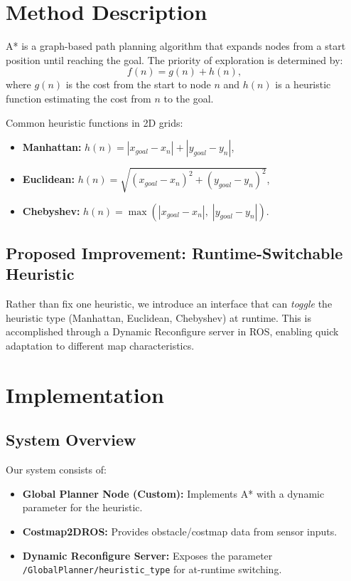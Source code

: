 \documentclass[letterpaper, 10 pt, conference]{ieeeconf}
\begin{document}
\section{Method Description}\label{sec:method}
A* \cite{hart1968formal} is a graph-based path planning algorithm that expands 
nodes from a start position until reaching the goal. The priority of exploration 
is determined by:
\begin{equation}
f(n) = g(n) + h(n),
\end{equation}
where $g(n)$ is the cost from the start to node $n$ and $h(n)$ is a heuristic 
function estimating the cost from $n$ to the goal. 

Common heuristic functions in 2D grids:
\begin{itemize}
    \item \textbf{Manhattan:} $h(n) = |x_{goal} - x_n| + |y_{goal} - y_n|$,
    \item \textbf{Euclidean:} $h(n) = \sqrt{(x_{goal}-x_n)^2 + (y_{goal}-y_n)^2}$,
    \item \textbf{Chebyshev:} $h(n) = \max(|x_{goal} - x_n|,\; |y_{goal} - y_n|).$
\end{itemize}

\subsection{Proposed Improvement: Runtime-Switchable Heuristic}
Rather than fix one heuristic, we introduce an interface that can \textit{toggle} 
the heuristic type (Manhattan, Euclidean, Chebyshev) at runtime. This is accomplished 
through a Dynamic Reconfigure server in ROS, enabling quick adaptation to different 
map characteristics.

\section{Implementation}\label{sec:implementation}
\subsection{System Overview}
Our system consists of:
\begin{itemize}
    \item \textbf{Global Planner Node (Custom):} Implements A* with a dynamic 
    parameter for the heuristic.
    \item \textbf{Costmap2DROS:} Provides obstacle/costmap data from sensor inputs.
    \item \textbf{Dynamic Reconfigure Server:} Exposes the parameter 
    \texttt{/GlobalPlanner/heuristic\_type} for at-runtime switching.
\end{itemize}
\end{document}
